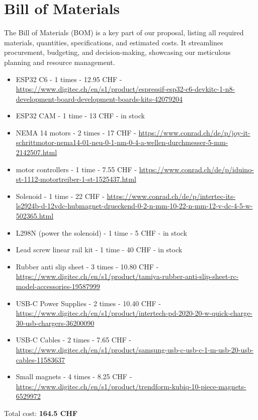 \section{Bill of Materials}

The Bill of Materials (BOM) is a key part of our proposal, listing all required materials, quantities, specifications, and estimated costs.
It streamlines procurement, budgeting, and decision-making, showcasing our meticulous planning and resource management.

\begin{itemize}
    \item ESP32 C6 - 1 times - 12.95 CHF - \url{https://www.digitec.ch/en/s1/product/espressif-esp32-c6-devkitc-1-n8-development-board-development-boards-kits-42079204}
    \item ESP32 CAM - 1 time - 13 CHF - in stock
    \item NEMA 14 motors - 2 times - 17 CHF - \url{https://www.conrad.ch/de/p/joy-it-schrittmotor-nema14-01-neu-0-1-nm-0-4-a-wellen-durchmesser-5-mm-2142507.html}
    \item motor controllers - 1 time - 7.55 CHF - \url{https://www.conrad.ch/de/p/iduino-st-1112-motortreiber-1-st-1525437.html}
    \item Solenoid - 1 time - 22 CHF - \url{https://www.conrad.ch/de/p/intertec-its-ls2924b-d-12vdc-hubmagnet-drueckend-0-2-n-mm-10-22-n-mm-12-v-dc-4-5-w-502365.html}
    \item L298N (power the solenoid) - 1 time - 5 CHF - in stock
    \item Lead screw linear rail kit - 1 time - 40 CHF - in stock
    \item Rubber anti slip sheet - 3 times - 10.80 CHF - \url{https://www.digitec.ch/en/s1/product/tamiya-rubber-anti-slip-sheet-rc-model-accessories-19587999}
    \item USB-C Power Supplies - 2 times - 10.40 CHF - \url{https://www.digitec.ch/en/s1/product/intertech-pd-2020-20-w-quick-charge-30-usb-chargers-36200090}
    \item USB-C Cables - 2 times - 7.65 CHF - \url{https://www.digitec.ch/en/s1/product/samsung-usb-c-usb-c-1-m-usb-20-usb-cables-11583637}
    \item Small magnets - 4 times - 8.25 CHF - \url{https://www.digitec.ch/en/s1/product/trendform-kubiq-10-piece-magnets-6529972}
\end{itemize}

Total cost: \textbf{164.5 CHF}
